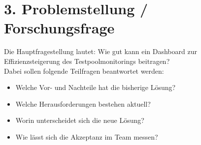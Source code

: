 
\section*{3. Problemstellung / Forschungsfrage}
Die Hauptfragestellung lautet: Wie gut kann ein Dashboard zur Effizienzsteigerung des Testpoolmonitorings beitragen?\\
Dabei sollen folgende Teilfragen beantwortet werden:
\begin{itemize}
    \item Welche Vor- und Nachteile hat die bisherige Lösung?
    \item Welche Herausforderungen bestehen aktuell?
    \item Worin unterscheidet sich die neue Lösung?
    \item Wie lässt sich die Akzeptanz im Team messen?
\end{itemize}